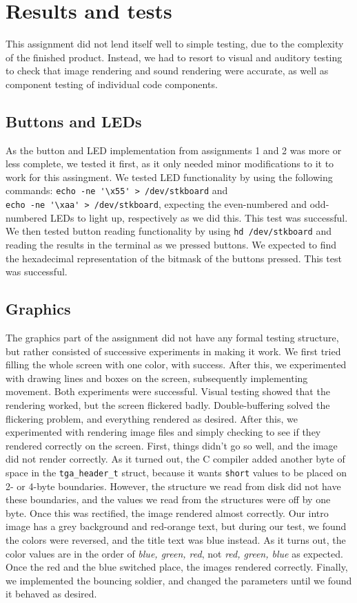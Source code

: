 \section{Results and tests}
This assignment did not lend itself well to simple testing, due to the
complexity of the finished product. Instead, we had to resort to visual
and auditory testing to check that image rendering and sound rendering
were accurate, as well as component testing of individual code
components.

\subsection{Buttons and LEDs}
As the button and LED implementation from assignments 1 and 2 was more
or less complete, we tested it first, as it only needed minor
modifications to it to work for this assingment.  We tested LED
functionality by using the following commands: 
\verb|echo -ne '\x55' > /dev/stkboard| and \\
\verb|echo -ne '\xaa' > /dev/stkboard|,
expecting the even-numbered and odd-numbered LEDs to light up,
respectively as we did this. This test was successful.  We then tested
button reading functionality by using \texttt{hd /dev/stkboard} and
reading the results in the terminal as we pressed buttons. We expected
to find the hexadecimal representation of the bitmask of the buttons
pressed. This test was successful.

\subsection{Graphics}
The graphics part of the assignment did not have any formal testing structure, but rather consisted of successive experiments in making it work. 
We first tried filling the whole screen with one color, with success.
After this, we experimented with drawing lines and boxes on the screen,
subsequently implementing movement. Both experiments were successful. Visual testing showed that the
rendering worked, but the screen flickered badly. Double-buffering solved the flickering problem, and everything rendered as desired.
After this, we experimented with rendering image files and simply checking to see if they rendered correctly on the screen. First, things didn't go so well, and the image did not render correctly. As it turned out, the C compiler added another byte of space in the \texttt{tga\_header\_t} struct, because it wants \texttt{short} values to be placed on 2- or 4-byte boundaries. However, the structure we read from disk did not have these boundaries, and the values we read from the structures were off by one byte. Once this was rectified, the image rendered almost correctly. Our intro image has a grey background and red-orange text, but during our test, we found the colors were reversed, and the title text was blue instead. As it turns out, the color values are in the order of \emph{blue, green, red}, not \emph{red, green, blue} as expected. Once the red and the blue switched place, the images rendered correctly.
Finally, we implemented the bouncing soldier, and changed the parameters until we found it behaved as desired.

